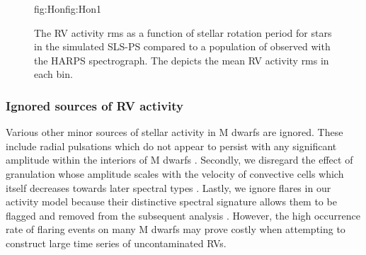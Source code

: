 \begin{figure}
\begin{ocg}{fig:Hon}{fig:Hon}{1}
  \end{ocg}
  \hspace{-0.6\hsize}%
  \caption[RV activity rms versus stellar rotation period.]
      {\small The RV activity rms as a function of stellar rotation period for stars in the simulated SLS-PS compared
    to a population of  observed with the HARPS
    spectrograph. The  depicts the mean
    RV activity rms in each \prot{} bin.}
  \label{BSfig:activityrms}
\end{figure}


\subsubsection{Ignored sources of RV activity}
Various other minor sources of stellar activity in M dwarfs are ignored. These include radial pulsations which 
do not appear to persist with any significant amplitude within the interiors of M dwarfs
\citep{rodriguezlopez15}. Secondly, we disregard the effect of granulation whose amplitude scales
with the velocity of convective cells which itself decreases towards later spectral types
\citep{dumusque11a, meunier17}.
Lastly, we ignore flares in our activity model because their distinctive
spectral signature allows them to be flagged and removed from the subsequent analysis
\citep{schmidt12, angladaescude16}.
However, the high occurrence rate of flaring events on many M dwarfs may prove costly when attempting to
construct large time series of uncontaminated RVs.


